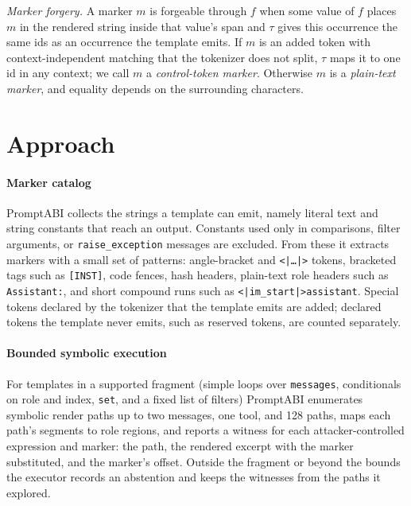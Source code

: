 \documentclass[10pt,conference]{IEEEtran}
\newcommand{\tool}{PromptABI\xspace}
\begin{document}
\emph{Marker forgery.} A marker $m$ is forgeable through $f$ when some value of
$f$ places $m$ in the rendered string inside that value's span and $\tau$ gives
this occurrence the same ids as an occurrence the template emits. If $m$ is an
added token with context-independent matching that the tokenizer does not split, $\tau$ maps it to one id in any
context; we call $m$ a \emph{control-token marker}. Otherwise $m$ is a
\emph{plain-text marker}, and equality depends on the surrounding characters.

\section{Approach}
\label{sec:approach}

\paragraph{Marker catalog} \tool collects the strings a template can emit, namely
literal text and string constants that reach an output. Constants used only in
comparisons, filter arguments, or \texttt{raise\_exception} messages are
excluded. From these it extracts markers with a small set of patterns:
angle-bracket and \texttt{<|\ldots|>} tokens, bracketed tags such as
\texttt{[INST]}, code fences, hash headers, plain-text role headers such as
\texttt{Assistant:}, and short compound runs such as
\texttt{<|im\_start|>assistant}. Special tokens declared by the tokenizer that
the template emits are added; declared tokens the template never emits, such as
reserved tokens, are counted separately.

\paragraph{Bounded symbolic execution} For templates in a supported fragment
(simple loops over \texttt{messages}, conditionals on role and index,
\texttt{set}, and a fixed list of filters) \tool enumerates symbolic render
paths up to two messages, one tool, and 128 paths, maps each path's segments to
role regions, and reports a witness for each attacker-controlled expression and
marker: the path, the rendered excerpt with the marker substituted, and the
marker's offset. Outside the fragment or beyond the bounds the executor records
an abstention and keeps the witnesses from the paths it explored.
\end{document}
